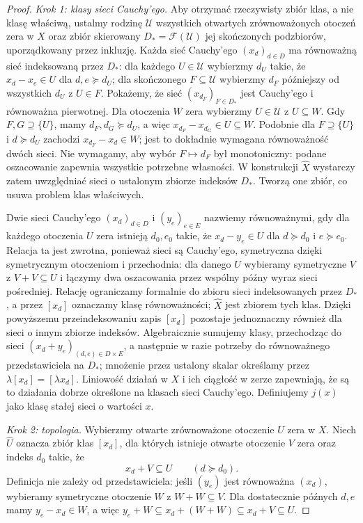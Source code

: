 \begin{proof}
\emph{Krok 1: klasy sieci Cauchy'ego.}
Aby otrzymać rzeczywisty zbiór klas, a nie klasę właściwą,
ustalmy rodzinę $\mathcal U$ wszystkich otwartych zrównoważonych
otoczeń zera w $X$ oraz zbiór skierowany
$D_*=\mathcal F(\mathcal U)$ jej skończonych podzbiorów,
uporządkowany przez inkluzję. Każda sieć Cauchy'ego $(x_d)_{d\in D}$
ma równoważną sieć indeksowaną przez $D_*$: dla każdego
$U\in\mathcal U$ wybierzmy $d_U$ takie, że
$x_d-x_e\in U$ dla $d,e\succeq d_U$; dla skończonego
$F\subseteq\mathcal U$ wybierzmy $d_F$ późniejszy od wszystkich
$d_U$ z $U\in F$. Pokażemy, że sieć $(x_{d_F})_{F\in D_*}$
jest Cauchy'ego i równoważna pierwotnej. Dla otoczenia
$W$ zera wybierzmy $U\in\mathcal U$ z $U\subseteq W$.
Gdy $F,G\supseteq\{U\}$, mamy $d_F,d_G\succeq d_U$,
a więc $x_{d_F}-x_{d_G}\in U\subseteq W$.
Podobnie dla $F\supseteq\{U\}$ i $d\succeq d_U$
zachodzi $x_{d_F}-x_d\in W$; jest to dokładnie
wymagana równoważność dwóch sieci. Nie wymagamy,
aby wybór $F\mapsto d_F$ był monotoniczny: podane
oszacowanie zapewnia wszystkie potrzebne własności.
W konstrukcji $\widehat X$ wystarczy zatem uwzględniać
sieci o ustalonym zbiorze indeksów $D_*$. Tworzą one
zbiór, co usuwa problem klas właściwych.

Dwie sieci Cauchy'ego $(x_d)_{d\in D}$ i $(y_e)_{e\in E}$
nazwiemy równoważnymi, gdy dla każdego otoczenia $U$ zera
istnieją $d_0,e_0$ takie, że
$x_d-y_e\in U$ dla $d\succeq d_0$ i $e\succeq e_0$.
Relacja ta jest zwrotna, ponieważ sieci są Cauchy'ego,
symetryczna dzięki symetrycznym otoczeniom i przechodnia:
dla danego $U$ wybieramy symetryczne $V$ z $V+V\subseteq U$
i łączymy dwa oszacowania przez wspólny późny wyraz
sieci pośredniej. Relację ograniczamy formalnie do zbioru sieci indeksowanych
przez $D_*$, a przez $[x_d]$ oznaczamy klasę
równoważności; $\widehat X$ jest zbiorem tych klas.
Dzięki powyższemu przeindeksowaniu zapis $[x_d]$
pozostaje jednoznaczny również dla sieci o innym zbiorze
indeksów. Algebraicznie sumujemy klasy, przechodząc do sieci
$(x_d+y_e)_{(d,e)\in D\times E}$, a następnie w razie potrzeby
do równoważnego przedstawiciela na $D_*$;
mnożenie przez ustalony skalar określamy przez
$\lambda[x_d]=[\lambda x_d]$. Liniowość działań w $X$
i ich ciągłość w zerze zapewniają, że są to działania
dobrze określone na klasach sieci Cauchy'ego.
Definiujemy $j(x)$ jako klasę stałej sieci o wartości $x$.

\emph{Krok 2: topologia.}
Wybierzmy otwarte zrównoważone otoczenie $U$ zera w $X$.
Niech $\widehat U$ oznacza zbiór klas $[x_d]$, dla których
istnieje otwarte otoczenie $V$ zera oraz indeks $d_0$ takie, że
\[
       x_d+V\subseteq U\qquad(d\succeq d_0).
\]
Definicja nie zależy od przedstawiciela: jeśli $(y_e)$
jest równoważna $(x_d)$, wybieramy symetryczne otoczenie
$W$ z $W+W\subseteq V$. Dla dostatecznie późnych $d,e$
mamy $y_e-x_d\in W$, a więc
$y_e+W\subseteq x_d+(W+W)\subseteq x_d+V\subseteq U$.


\end{proof}
